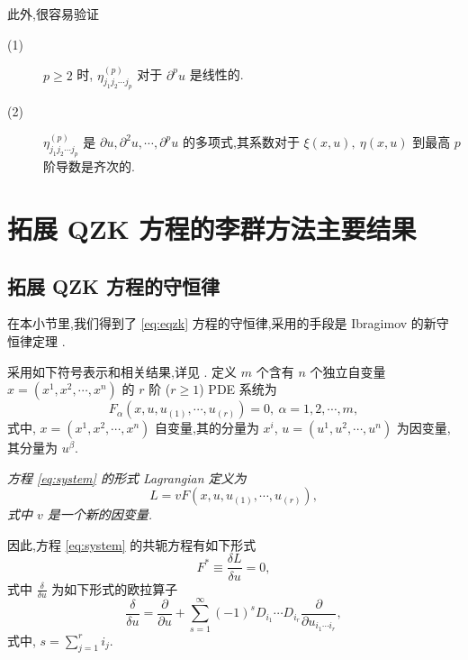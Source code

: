 此外,很容易验证
\begin{description}
	\item[(1)] $p\geq 2$ 时, $\eta_{j_1j_2\cdots j_p}^{(p)}$ 对于 $\partial^pu$ 是线性的.
	\item[(2)] $\eta_{j_1j_2\cdots j_p}^{(p)}$ 是 $\partial u,\partial^2u,\cdots,\partial^pu$ 的多项式,其系数对于 $\xi(x,u),~\eta(x,u)$ 到最高 $p$ 阶导数是齐次的.
\end{description}

\section{拓展 QZK 方程的李群方法主要结果}

\subsection{拓展 QZK 方程的守恒律}\label{sec:05con}
在本小节里,我们得到了 \eqref{eq:eqzk} 方程的守恒律,采用的手段是 Ibragimov 的新守恒律定理 \cite{wazwaz2012soli,yan2009per}.

采用如下符号表示和相关结果,详见 \cite{wazwaz2012soli,yan2009per,yasar2010con,zakharov1974on}. 定义 $m$ 个含有 $n$ 个独立自变量 $x=(x^1,x^2,\cdots,x^n)$ 的 $r$ 阶  ($r\geq1$) PDE 系统为
\begin{equation}\label{eq:system}
F_\alpha(x,u,u_{(1)},\cdots,u_{(r)})=0,~ \alpha=1,2,\cdots,m,
\end{equation}
式中, $x=(x^1,x^2,\cdots,x^n)$ 自变量,其的分量为 $x^i$, $u=(u^1,u^2,\cdots,u^n)$ 为因变量,其分量为 $u^\beta$.

\begin{definition}[形式 Lagrangian]
	\emph{方程 \eqref{eq:system} 的形式 Lagrangian 定义为
	\begin{equation*}
		L=vF(x,u,u_{(1)},\cdots,u_{(r)}),
	\end{equation*}
	式中 $v$ 是一个新的因变量.}
\end{definition}

因此,方程 \eqref{eq:system} 的共轭方程有如下形式
\begin{equation}\label{eq:adjoint}
	F^*\equiv \frac{\delta L}{\delta u} = 0,
\end{equation}
式中 $\displaystyle \frac{\delta}{\delta u}$ 为如下形式的欧拉算子
\begin{equation*}
	\frac{\delta}{\delta u} = \frac{\partial}{\partial u}+\sum_{s=1}^{\infty}(-1)^{s}D_{i_1}\cdots D_{i_r}\frac{\partial}{\partial u_{i_1\cdots i_r}},
\end{equation*}
式中, $s=\sum_{j=1}^{r}i_j$.

